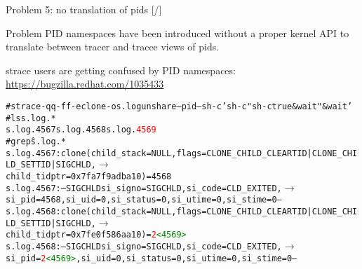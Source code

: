 \documentclass[unicode,aspectratio=169]{beamer}
\begin{document}
\begin{frame}[fragile]{Problem 5: no translation of pids \hfill [\insertframenumber/\inserttotalframenumber]}
\begin{block}{Problem}
PID namespaces have been introduced without a proper kernel API
to translate between tracer and tracee views of pids.
\end{block}

\begin{block}{strace users are getting confused by PID namespaces: \\ \url{https://bugzilla.redhat.com/1035433}}
\scriptsize
\begin{alltt}
# strace -qq -ff -e clone -o s.log unshare --pid -- sh -c 'sh -c "sh -c true & wait" & wait'
# ls s.log.*
s.log.4567  s.log.4568  s.log.\textcolor{red}{4569}
# grep \^ s.log.*
s.log.4567:clone(child_stack=NULL, flags=CLONE_CHILD_CLEARTID|CLONE_CHILD_SETTID|SIGCHLD, \(\longrightarrow\)
           child_tidptr=0x7fa7f9adba10) = 4568
s.log.4567:--- SIGCHLD {si_signo=SIGCHLD, si_code=CLD_EXITED, \(\longrightarrow\)
           si_pid=4568, si_uid=0, si_status=0, si_utime=0, si_stime=0} ---
s.log.4568:clone(child_stack=NULL, flags=CLONE_CHILD_CLEARTID|CLONE_CHILD_SETTID|SIGCHLD, \(\longrightarrow\)
           child_tidptr=0x7fe0f586aa10) = \textcolor{red}{2}\textcolor{green}{<4569>}
s.log.4568:--- SIGCHLD {si_signo=SIGCHLD, si_code=CLD_EXITED, \(\longrightarrow\)
           si_pid=\textcolor{red}{2}\textcolor{green}{<4569>}, si_uid=0, si_status=0, si_utime=0, si_stime=0} ---
\end{alltt}
\end{block}
\end{frame}
\end{document}
